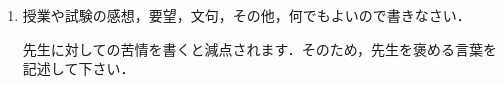 \documentclass[a4paper,11pt]{ltjsarticle}
\begin{document}
\begin{enumerate}
    \vspace{5pt}

    \item 授業や試験の感想，要望，文句，その他，何でもよいので書きなさい．

    \vspace{5pt}

    先生に対しての苦情を書くと減点されます．そのため，先生を褒める言葉を記述して下さい．

    \vspace{5pt}

\end{enumerate}
\end{document}
